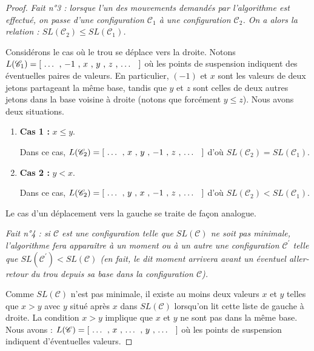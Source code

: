 \begin{proof}
	\textit{Fait n°3 : lorsque l'un des mouvements demandés par l'algorithme est effectué, on passe d'une configuration $\mathscr{C}_1$ à une configuration $\mathscr{C}_2$. On a alors la relation : $SL(\mathscr{C}_2) \leqslant SL(\mathscr{C}_1)$.}


	\medskip

	Considérons le cas où le trou se déplace vers la droite. 
	Notons $L(\mathscr{C}_1) = [ \text{\ \dots{} , $-1$ , $x$ , $y$ , $z$ , \dots{} \ } ]$ où les points de suspension indiquent des éventuelles paires de valeurs. En particulier, $(-1)$ et $x$ sont les valeurs de deux jetons partageant la même base, tandis que $y$ et $z$ sont celles de deux autres jetons dans la base voisine à droite (notons que forcément $y \leqslant z$). Nous avons deux situations.

	\begin{enumerate}
		\item \textbf{Cas 1 :} $x \leqslant y$.
		
		Dans ce cas, $L(\mathscr{C}_2) = [ \text{\ \dots{} , $x$ , $y$ , $-1$ , $z$ , \dots{} \ } ]$ d'où $SL(\mathscr{C}_2) = SL(\mathscr{C}_1)$.
	
		\item \textbf{Cas 2 :} $y < x$.
		
		Dans ce cas, $L(\mathscr{C}_2) = [ \text{\ \dots{} , $y$ , $x$ , $-1$ , $z$ , \dots{} \ } ]$ d'où $SL(\mathscr{C}_2) < SL(\mathscr{C}_1)$.
		\end{enumerate}

	Le cas d'un déplacement vers la gauche se traite de façon analogue.
	
	
	\medskip

	\textit{Fait n°4 : si $\mathscr{C}$ est une configuration telle que $SL(\mathscr{C})$ ne soit pas minimale, l'algorithme fera apparaître à un moment ou à un autre une configuration $\mathscr{C}^\prime$ telle que $SL(\mathscr{C}^\prime) < SL(\mathscr{C})$ (en fait, le dit moment arrivera avant un éventuel aller-retour  du trou depuis sa base dans la configuration $\mathscr{C}$).}


	\medskip

	Comme $SL(\mathscr{C})$ n'est pas minimale, il existe au moins deux valeurs $x$ et $y$ telles que $x > y$ avec $y$ situé après $x$ dans $SL(\mathscr{C})$ lorsqu'on lit cette liste de gauche à droite. 
	La condition $x > y$ implique que $x$ et $y$ ne sont pas dans la même base. Nous avons : $L(\mathscr{C}) = [ \text{\ \dots{} , $x$ , \dots{} , $y$ , \dots{} \ } ]$ où les points de suspension indiquent d'éventuelles valeurs.



\end{proof}
